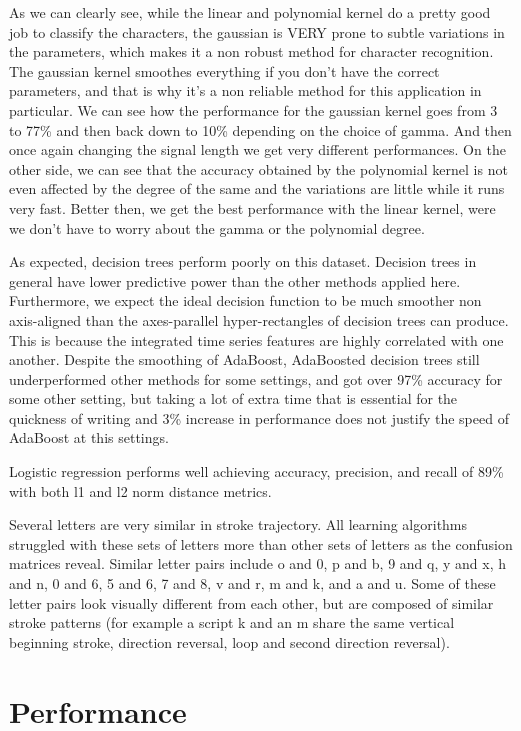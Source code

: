 \documentclass{article}
\begin{document}
As we can clearly see, while the linear and polynomial kernel do a pretty good job to classify the characters, the gaussian is VERY prone to subtle variations in the parameters, which makes it a non robust method for character recognition. The gaussian kernel smoothes everything if you don't have the correct parameters, and that is why it's a non reliable method for this application in particular. We can see how the performance for the gaussian kernel goes from 3 to 77\% and then back down to 10\% depending on the choice of gamma. And then once again changing the signal length we get very different performances. \newline
On the other side, we can see that the accuracy obtained by the polynomial kernel is not even affected by the degree of the same and the variations are little while it runs very fast. Better then, we get the best performance with the linear kernel, were we don't have to worry about the gamma or the polynomial degree.

As expected, decision trees perform poorly on this dataset.  Decision trees in general have lower predictive power than the other methods applied here.  Furthermore, we expect the ideal decision function to be much smoother non axis-aligned than the axes-parallel hyper-rectangles of decision trees can produce.  This is because the integrated time series features are highly correlated with one another.  Despite the smoothing of AdaBoost, AdaBoosted decision trees still underperformed other methods for some settings, and got over 97\% accuracy for some other setting, but taking a lot of extra time that is essential for the quickness of writing and 3\% increase in performance does not justify the speed of AdaBoost at this settings.

Logistic regression performs well achieving accuracy, precision, and recall of 89\% with both l1 and l2 norm distance metrics.  
 
Several letters are very similar in stroke trajectory.  All learning algorithms struggled with these sets of letters more than other sets of letters as the confusion matrices reveal.  Similar letter pairs include o and 0, p and b, 9 and q, y and x, h and n, 0 and 6, 5 and 6, 7 and 8, v and r, m and k, and a and u.  Some of these letter pairs look visually different from each other, but are composed of similar stroke patterns (for example a script k and an m share the same vertical beginning stroke, direction reversal, loop and second direction reversal).


\section{Performance}
\end{document}
